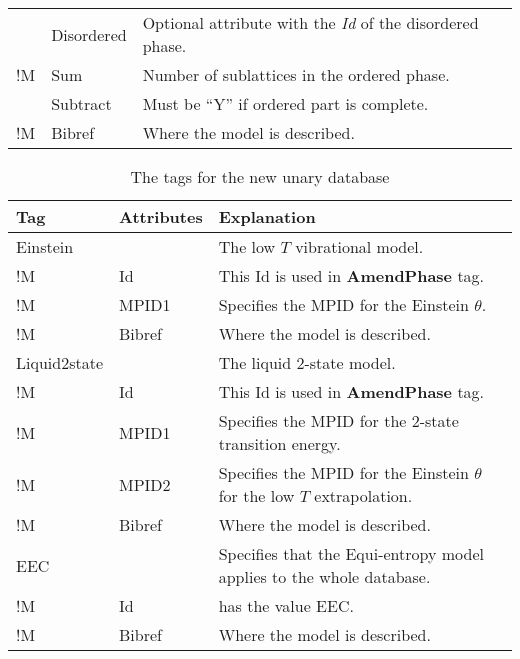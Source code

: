 \documentclass[10pt]{article}
\begin{document}
\begin{table}[!h]
\begin{tabular}{|p{} p{} p{}|}
  & Disordered & Optional attribute with the {\em Id} of the disordered phase.\\

!M & Sum  & Number of sublattices in the ordered phase. \\

   & Subtract & Must be ``Y'' if ordered part is complete.\\
!M & Bibref & Where the model is described.\\\hline
\end{tabular}
\end{table}


\begin{table}[!h]
  \caption{The tags for the new unary database}
\begin{tabular}{|p{} p{} p{}|}\hline
  Tag & Attributes & Explanation\\\hline

  Einstein & & The low $T$ vibrational model.\\
!M      & Id & This Id is used in {\bf AmendPhase} tag.\\
!M      & MPID1 & Specifies the MPID for the Einstein $\theta$.\\
!M      & Bibref & Where the model is described.\\\hline

  Liquid2state & & The liquid 2-state model.\\
!M      & Id & This Id is used in {\bf AmendPhase} tag.\\
!M      & MPID1 & Specifies the MPID for the 2-state transition energy. \\
!M      & MPID2 & Specifies the MPID for the Einstein $\theta$
                   for the low $T$ extrapolation.\\
!M      & Bibref & Where the model is described.\\\hline

  EEC & & Specifies that the Equi-entropy model applies to the whole database.\\
!M      & Id     & has the value EEC.\\
!M      & Bibref & Where the model is described.\\\hline

\end{tabular}
\end{table}
\end{document}
